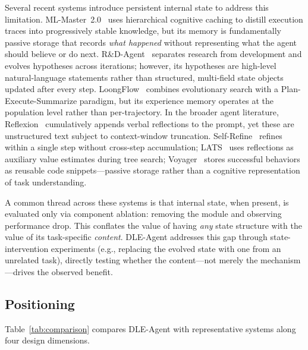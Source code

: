 \documentclass{article} %
\begin{document}
Several recent systems introduce persistent internal state to address this
limitation. ML-Master~2.0~\citep{zhu2026mlmaster} uses hierarchical cognitive
caching to distill execution traces into progressively stable knowledge, but
its memory is fundamentally passive storage that records \emph{what happened}
without representing what the agent should believe or do next.
R\&D-Agent~\citep{yang2025rdagent} separates research from development and
evolves hypotheses across iterations; however, its hypotheses are high-level
natural-language statements rather than structured, multi-field state objects
updated after every step. LoongFlow~\citep{wan2025loongflow} combines
evolutionary search with a Plan-Execute-Summarize paradigm, but its
experience memory operates at the population level rather than per-trajectory.
In the broader agent literature, Reflexion~\citep{shinn2023reflexion}
cumulatively appends verbal reflections to the prompt, yet these are
unstructured text subject to context-window truncation.
Self-Refine~\citep{madaan2023selfrefine} refines within a single step without
cross-step accumulation; LATS~\citep{zhou2024lats} uses reflections as
auxiliary value estimates during tree search;
Voyager~\citep{wang2023voyager} stores successful behaviors as reusable code
snippets---passive storage rather than a cognitive representation of task
understanding.

A common thread across these systems is that internal state, when present, is
evaluated only via component ablation: removing the module and observing
performance drop. This conflates the value of having \emph{any} state
structure with the value of its task-specific \emph{content}. DLE-Agent
addresses this gap through state-intervention experiments (e.g., replacing the
evolved state with one from an unrelated task), directly testing whether the
content---not merely the mechanism---drives the observed benefit.

\subsection{Positioning}
\label{sec:rw-position}

Table~\ref{tab:comparison} compares DLE-Agent with representative systems
along four design dimensions.
\end{document}
